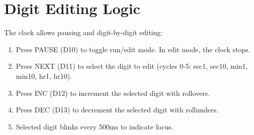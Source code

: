 \section{Digit Editing Logic}
The clock allows pausing and digit-by-digit editing:

\begin{enumerate}
    \item Press PAUSE (D10) to toggle run/edit mode. In edit mode, the clock stops.
    \item Press NEXT (D11) to select the digit to edit (cycles 0-5: sec1, sec10, min1, min10, hr1, hr10).
    \item Press INC (D12) to increment the selected digit with rollovers.
    \item Press DEC (D13) to decrement the selected digit with rollunders.
    \item Selected digit blinks every 500ms to indicate focus.
\end{enumerate}

